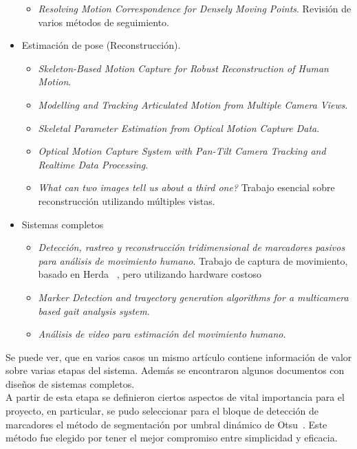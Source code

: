 \begin{itemize}
\begin{itemize}
		\item \emph{Resolving Motion Correspondence for Densely Moving Points}\cite{survey_tracking}. Revisión de varios métodos de seguimiento.
	\end{itemize}
	\item Estimación de pose (Reconstrucción).
	\begin{itemize}
		\item \emph{Skeleton-Based Motion Capture for Robust Reconstruction of Human Motion}\cite{herda}.
		\item \emph{Modelling and Tracking Articulated Motion from Multiple Camera Views}\cite{ringer2000modelling}.
		\item \emph{Skeletal Parameter Estimation from Optical Motion Capture Data}\cite{kirk2005skeletal}.
		\item \emph{Optical Motion Capture System with Pan-Tilt Camera Tracking and  Realtime Data Processing}\cite{kurihara2002optical}.
		\item \emph{What can two images tell us about a third one?}\cite{faugueras} Trabajo esencial sobre reconstrucción utilizando múltiples vistas.
	\end{itemize}
	\item Sistemas completos
	\begin{itemize}
		\item \emph{Detección, rastreo y reconstrucción tridimensional de marcadores pasivos para análisis de movimiento humano}\cite{colombianos}.	Trabajo de captura de movimiento, basado en Herda ~\cite{herda}, pero utilizando hardware costoso
		\item \emph{Marker Detection and trayectory generation algorithms for a multicamera based gait analysis system}\cite{shafiq2001marker}.
		\item \emph{Análisis de video para estimación del movimiento humano}\cite{martinez2009analisis}.
	\end{itemize}
\end{itemize}

Se puede ver, que en varios casos un mismo artículo contiene información de valor sobre varias etapas del sistema. Además se encontraron algunos documentos con diseños de sistemas completos.
\\ 

A partir de esta etapa se definieron ciertos aspectos de vital importancia para el proyecto, en particular, se pudo seleccionar para el bloque de detección de marcadores el método de segmentación por umbral dinámico de Otsu~\cite{otsu}. Este método fue elegido por tener el mejor compromiso entre simplicidad y eficacia.
\\ 

